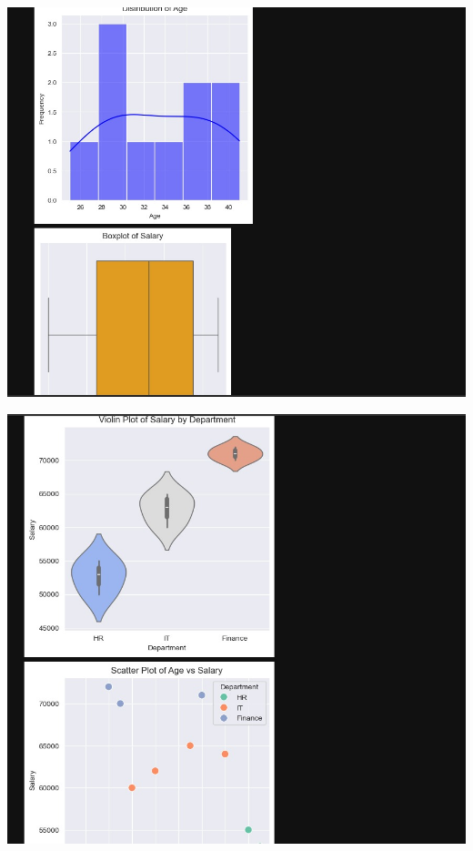 \documentclass{article}
\begin{document}
\includegraphics[width=14cm,height=10
cm]{Visualizing_Output.jpeg}

\includegraphics[width=14cm,height=10
cm]{Visualizing_Output2.jpeg}
\end{document}
